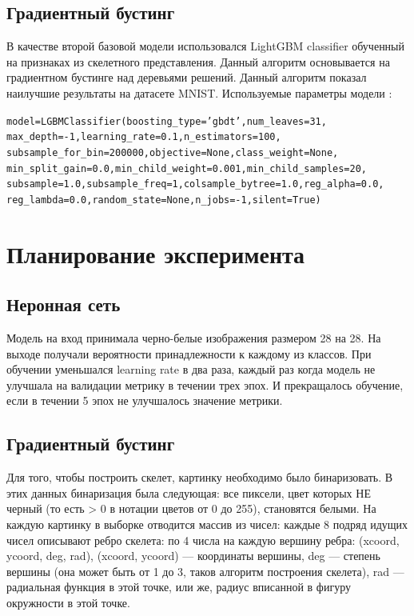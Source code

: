 \documentclass{llncs}
\begin{document}
\subsection{Градиентный бустинг}
В качестве второй базовой модели использовался LightGBM classifier обученный на признаках из скелетного представления. Данный алгоритм основывается на градиентном бустинге над деревьями решений. Данный алгоритм показал наилучшие результаты на датасете MNIST. Используемые параметры модели : 
\begin{alltt}
model = LGBMClassifier(boosting_type='gbdt', num_leaves=31, 
max_depth=-1,learning_rate=0.1,n_estimators=100, 
subsample_for_bin=200000, objective=None, class_weight=None, 
min_split_gain=0.0,min_child_weight=0.001, min_child_samples=20,
subsample=1.0, subsample_freq=1, colsample_bytree=1.0,reg_alpha=0.0,
reg_lambda=0.0,random_state=None, n_jobs=-1, silent=True)
\end{alltt}


\section{Планирование эксперимента}
\subsection{Неронная сеть}
Модель на вход принимала черно-белые изображения размером 28 на 28. На выходе получали вероятности принадлежности к каждому из классов. При обучении уменьшался learning rate в два раза, каждый раз когда модель не улучшала на валидации метрику в течении трех эпох. И прекращалось обучение, если в течении 5 эпох не улучшалось значение метрики.
\subsection{Градиентный бустинг}
Для того, чтобы построить скелет, картинку необходимо было бинаризовать. В этих данных бинаризация была следующая: все пиксели, цвет которых НЕ черный (то есть > 0 в нотации цветов от 0 до 255), становятся белыми. 
На каждую картинку в выборке отводится массив из чисел: каждые 8 подряд идущих чисел описывают ребро скелета: по 4 числа на каждую вершину ребра: (xcoord, ycoord, deg, rad), (xcoord, ycoord) — координаты вершины, deg — степень вершины (она может быть от 1 до 3, таков алгоритм построения скелета), rad — радиальная функция в этой точке, или же, радиус вписанной в фигуру окружности в этой точке.
\end{document}
